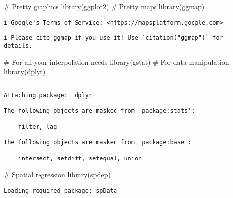 \documentclass[
  letterpaper,
  krantz2]{style/krantz}
\newenvironment{Shaded}{\begin{snugshade}}{\end{snugshade}}
\newcommand{\CommentTok}[1]{\textcolor[rgb]{0.37,0.37,0.37}{#1}}
\newcommand{\FunctionTok}[1]{\textcolor[rgb]{0.28,0.35,0.67}{#1}}
\newcommand{\NormalTok}[1]{\textcolor[rgb]{0.00,0.23,0.31}{#1}}
\begin{document}
\begin{Shaded}
\begin{Highlighting}[]
\CommentTok{\# Pretty graphics}
\FunctionTok{library}\NormalTok{(ggplot2)}
\CommentTok{\# Pretty maps}
\FunctionTok{library}\NormalTok{(ggmap)}
\end{Highlighting}
\end{Shaded}

\begin{verbatim}
i Google's Terms of Service: <https://mapsplatform.google.com>
\end{verbatim}

\begin{verbatim}
i Please cite ggmap if you use it! Use `citation("ggmap")` for details.
\end{verbatim}

\begin{Shaded}
\begin{Highlighting}[]
\CommentTok{\# For all your interpolation needs}
\FunctionTok{library}\NormalTok{(gstat)}
\CommentTok{\# For data manipulation}
\FunctionTok{library}\NormalTok{(dplyr)}
\end{Highlighting}
\end{Shaded}

\begin{verbatim}

Attaching package: 'dplyr'
\end{verbatim}

\begin{verbatim}
The following objects are masked from 'package:stats':

    filter, lag
\end{verbatim}

\begin{verbatim}
The following objects are masked from 'package:base':

    intersect, setdiff, setequal, union
\end{verbatim}

\begin{Shaded}
\begin{Highlighting}[]
\CommentTok{\# Spatial regression}
\FunctionTok{library}\NormalTok{(spdep)}
\end{Highlighting}
\end{Shaded}

\begin{verbatim}
Loading required package: spData
\end{verbatim}
\end{document}
